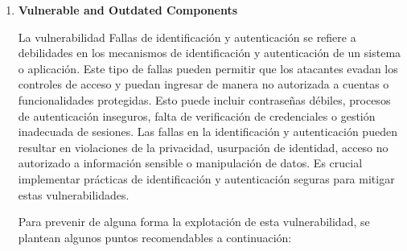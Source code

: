 \documentclass[12pt,oneside,a4paper]{book}
\begin{document}
\begin{enumerate}
\begin{enumerate}
        \vspace{2em}

        \item{\textbf{Vulnerable and Outdated Components}}

        \vspace{1em}

        \hspace{20pt}
        La vulnerabilidad Fallas de identificación y autenticación se refiere a debilidades en los mecanismos de identificación y autenticación de un sistema o aplicación. Este tipo de fallas pueden permitir que los atacantes evadan los controles de acceso y puedan ingresar de manera no autorizada a cuentas o funcionalidades protegidas. Esto puede incluir contraseñas débiles, procesos de autenticación inseguros, falta de verificación de credenciales o gestión inadecuada de sesiones. Las fallas en la identificación y autenticación pueden resultar en violaciones de la privacidad, usurpación de identidad, acceso no autorizado a información sensible o manipulación de datos. Es crucial implementar prácticas de identificación y autenticación seguras para mitigar estas vulnerabilidades.

        \vspace{1em}

        \hspace{20pt}
        Para prevenir de alguna forma la explotación de esta vulnerabilidad, se plantean algunos puntos recomendables a continuación:

        \vspace{1em}


\end{enumerate}
\end{enumerate}
\end{document}
